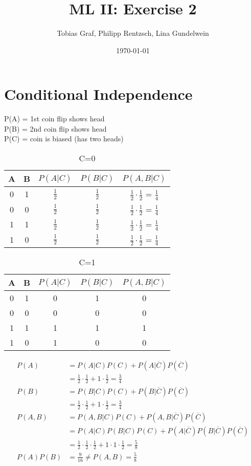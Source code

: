 \documentclass{article}
\title{ML II:  Exercise 2} %
\author{Tobias Graf, Philipp Rentzsch, Lina Gundelwein} %
\date{\today}
\begin{document}
	\maketitle
	
	\section{Conditional Independence}
	
	\noindent P(A) = 1st coin flip shows head\\
	P(B) = 2nd coin flip shows head\\
	P(C) = coin is biased (has two heads)
	
	\begin{table}[htb]
		\caption{C=0}
		\centering
		\begin{tabular}{ | c | c | c| c | c|}
			\hline
			A & B & $P(A|C)$ & $P(B|C)$ & $P(A,B|C)$ \\ \hline
			0 & 1 & $\frac{1}{2}$ & $\frac{1}{2}$ & $\frac{1}{2}\cdot\frac{1}{2}$ = $\frac{1}{4}$ \\ \hline 
			0 & 0 & $\frac{1}{2}$ & $\frac{1}{2}$ & $\frac{1}{2}\cdot \frac{1}{2}$ = $\frac{1}{4}$ \\ \hline
			1 & 1 & $\frac{1}{2}$ & $\frac{1}{2}$ & $\frac{1}{2}\cdot\frac{1}{2}$ = $\frac{1}{4}$ \\ \hline
			1 & 0 & $\frac{1}{2}$ & $\frac{1}{2}$ & $\frac{1}{2}\cdot\frac{1}{2}$ = $\frac{1}{4}$ \\  \hline
		\end{tabular}
	\end{table}
	
	\begin{table}[htb]
		\caption{C=1}
		\centering
		\begin{tabular}{ | c | c | c| c | c|}
			\hline
			A & B & $P(A|C)$ & $P(B|C)$ & $P(A,B|C)$ \\ \hline
			0 & 1 &0 &1 & 0 \\ \hline 
			0 & 0 &0 & 0 & 0 \\ \hline
			1 & 1 & 1 & 1 & 1 \\ \hline
			1 & 0 & 1 & 0 & 0 \\  \hline
		\end{tabular}
	\end{table}
	
	\begin{align*}
	P(A) &= P(A|C)P(C)+P(A|\overline{C})P(\overline{C}) \\&= \frac{1}{2}\cdot\frac{1}{2} + 1\cdot\frac{1}{2}=\frac{3}{4}\\
	P(B) &= P(B|C)P(C)+P(B|\overline{C})P(\overline{C}) \\&= \frac{1}{2}\cdot\frac{1}{2} + 1\cdot\frac{1}{2}=\frac{3}{4}\\
	P(A,B) &= P(A, B|C)P(C)+P(A, B|\overline{C})P(\overline{C}) \\&= P(A|C)P(B|C)P(C)+P(A|\overline{C})P(B|\overline{C})P(\overline{C})\\& = \frac{1}{2}\cdot \frac{1}{2}\cdot \frac{1}{2}  + 1\cdot 1\cdot \frac{1}{2}= \frac{5}{8}
	\\
	P(A)P(B) &= \frac{9}{16} \neq P(A,B) = \frac{5}{8}
	\end{align*}
	
\end{document}
